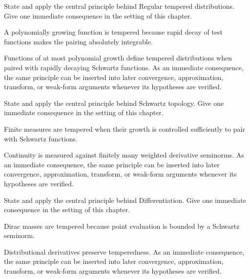 \begin{exercise}\label{exr:iii18-02}
State and apply the central principle behind Regular tempered distributions. Give one immediate consequence in the setting of this chapter.
\end{exercise}
\begin{hint}
A polynomially growing function is tempered because rapid decay of test functions makes the pairing absolutely integrable.
\end{hint}
\begin{solution}
Functions of at most polynomial growth define tempered distributions when paired with rapidly decaying Schwartz functions. As an immediate consequence, the same principle can be inserted into later convergence, approximation, transform, or weak-form arguments whenever its hypotheses are verified.
\end{solution}

\begin{exercise}\label{exr:iii18-03}
State and apply the central principle behind Schwartz topology. Give one immediate consequence in the setting of this chapter.
\end{exercise}
\begin{hint}
Finite measures are tempered when their growth is controlled sufficiently to pair with Schwartz functions.
\end{hint}
\begin{solution}
Continuity is measured against finitely many weighted derivative seminorms. As an immediate consequence, the same principle can be inserted into later convergence, approximation, transform, or weak-form arguments whenever its hypotheses are verified.
\end{solution}

\begin{exercise}\label{exr:iii18-04}
State and apply the central principle behind Differentiation. Give one immediate consequence in the setting of this chapter.
\end{exercise}
\begin{hint}
Dirac masses are tempered because point evaluation is bounded by a Schwartz seminorm.
\end{hint}
\begin{solution}
Distributional derivatives preserve temperedness. As an immediate consequence, the same principle can be inserted into later convergence, approximation, transform, or weak-form arguments whenever its hypotheses are verified.
\end{solution}

